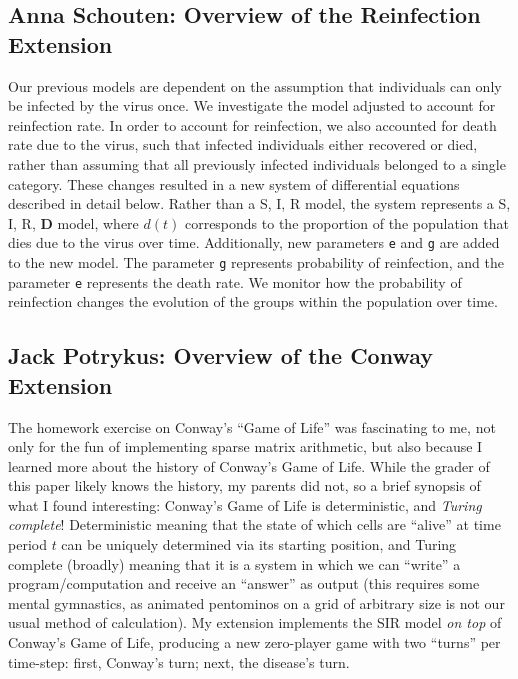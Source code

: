 \documentclass[twoside]{extarticle}                                    %
\numberwithin{equation}{section}                                       %
\begin{document}
\subsection{Anna Schouten: Overview of the Reinfection Extension}
Our previous models are dependent on the assumption that individuals can only be infected by the virus once. We investigate the model adjusted to account for reinfection rate. In order to account for reinfection, we also accounted for death rate due to the virus, such that infected individuals either recovered or died, rather than assuming that all previously infected individuals belonged to a single category. These changes resulted in a new system of differential equations described in detail below. Rather than a S, I, R model, the system represents a S, I, R, \textbf{D} model, where $d(t)$ corresponds to the proportion of the population that dies due to the virus over time. Additionally, new parameters \texttt{e} and \texttt{g} are added to the new model. The parameter \texttt{g} represents probability of reinfection, and the parameter \texttt{e} represents the death rate. We monitor how the probability of reinfection changes the evolution of the groups within the population over time.


\subsection{Jack Potrykus: Overview of the Conway Extension}
The homework exercise on Conway's ``Game of Life'' was fascinating to me, not only for the fun of implementing sparse matrix arithmetic, but also because I learned more about the history of Conway's Game of Life. While the grader of this paper likely knows the history, my parents did not, so a brief synopsis of what I found interesting: Conway's Game of Life is deterministic, and \emph{Turing complete}! Deterministic meaning that the state of which cells are ``alive'' at time period $t$ can be uniquely determined via its starting position, and Turing complete (broadly) meaning that it is a system in which we can ``write'' a program/computation and receive an ``answer'' as output (this requires some mental gymnastics, as animated pentominos on a grid of arbitrary size is not our usual method of calculation). My extension implements the SIR model \emph{on top} of Conway's Game of Life, producing a new zero-player game with two ``turns'' per time-step: first, Conway's turn; next, the disease's turn.
\end{document}
